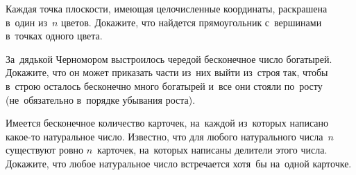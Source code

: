 



\begin{problems}

\item
Каждая точка плоскости, имеющая целочисленные координаты, раскрашена в~один
из~$n$ цветов.
Докажите, что найдется прямоугольник с~вершинами в~точках одного цвета.

\item
За~дядькой Черномором выстроилось чередой бесконечное число богатырей.
Докажите, что он может приказать части из~них выйти из~строя так, чтобы в~строю
осталось бесконечно много богатырей и~все они стояли по~росту (не~обязательно
в~порядке убывания роста).

\item
Имеется бесконечное количество карточек, на~каждой из~которых написано какое-то
натуральное число.
Известно, что для любого натурального числа~$n$ существуют ровно $n$~карточек,
на~которых написаны делители этого числа.
Докажите, что любое натуральное число встречается хотя~бы на~одной карточке.

\end{problems}

